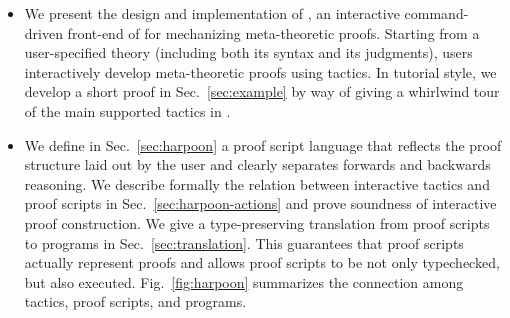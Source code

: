 \begin{itemize}
\item
  We present the design and implementation of \Harpoon, an
  interactive command-driven front-end of \Beluga{} for mechanizing
  meta-theoretic proofs.
  Starting from a user-specified theory (including both its syntax and its
  judgments), users interactively develop meta-theoretic proofs using tactics.
  In tutorial style, we develop a short proof in Sec.~\ref{sec:example} by way
  of giving a whirlwind tour of the main supported tactics in \Harpoon.


\item
  We define in Sec.~\ref{sec:harpoon} a proof script language that reflects
  the proof structure laid out by the user and clearly separates forwards and
  backwards reasoning.
  We describe formally the relation between interactive tactics and proof
  scripts in Sec.~\ref{sec:harpoon-actions} and prove soundness of interactive
  proof construction.
  We give a type-preserving translation from proof scripts to \Beluga{} programs
  in Sec.~\ref{sec:translation}.
  This guarantees that proof scripts actually represent proofs and allows proof
  scripts to be not only typechecked, but also executed.
  Fig.~\ref{fig:harpoon} summarizes the connection among tactics, proof
  scripts, and \Beluga{} programs.


\end{itemize}
